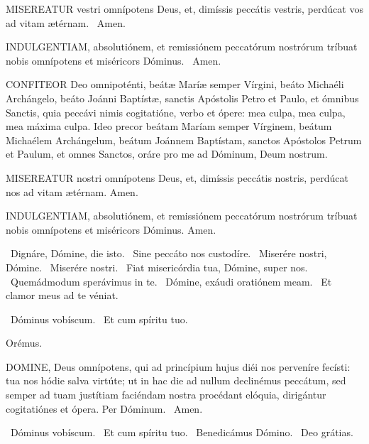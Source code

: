 \lettrine[lines=2]{M}{ISEREATUR} vestri omnípotens Deus, et, dimíssis peccátis vestris, perdúcat vos ad vitam ætérnam. \R\ Amen.

\lettrine[lines=2]{I}{NDULGENTIAM}, absolutiónem, et remissiónem peccatórum nostrórum tríbuat nobis omnípotens et miséricors Dóminus. \R\ Amen.


\lettrine[lines=2]{C}{ONFITEOR} Deo omnipoténti, beátæ Maríæ semper Vírgini, beáto Michaéli Archángelo, beáto Joánni Baptístæ, sanctis Apóstolis Petro et Paulo, et ómnibus Sanctis, quia peccávi nimis cogitatióne, verbo et ópere: mea culpa, mea culpa, mea máxima culpa. Ideo precor beátam Maríam semper Vírginem, beátum Michaélem Archángelum, beátum Joánnem Baptístam, sanctos Apóstolos Petrum et Paulum, et omnes Sanctos, oráre pro me ad Dóminum, Deum nostrum.


\lettrine[lines=2]{M}{ISEREATUR} nostri omnípotens Deus, et, dimíssis peccátis nostris, perdúcat nos ad vitam ætérnam. Amen.

\lettrine[lines=2]{I}{NDULGENTIAM}, absolutiónem, et remissiónem peccatórum nostrórum tríbuat nobis omnípotens et miséricors Dóminus. Amen.


\V\ Dignáre, Dómine, die isto. \R\ Sine peccáto nos custodíre. \V\ Miserére nostri, Dómine. \R\ Miserére nostri. \V\ Fiat misericórdia tua, Dómine, super nos. \R\ Quemádmodum sperávimus in te. \V\ Dómine, exáudi oratiónem meam. \R\ Et clamor meus ad te véniat.


\V\ Dóminus vobíscum. \R\ Et cum spíritu tuo.

Orémus. 

\lettrine[lines=2]{D}{OMINE}, Deus omnípotens, qui ad princípium hujus diéi nos perveníre fecísti: tua nos hódie salva virtúte; ut in hac die ad nullum declinémus peccátum, sed semper ad tuam justítiam faciéndam nostra procédant elóquia, dirigántur cogitatiónes et ópera. Per Dóminum. \R\ Amen.

\V\ Dóminus vobíscum. \R\ Et cum spíritu tuo. \V\ Benedicámus Dómino. \R\ Deo grátias.

